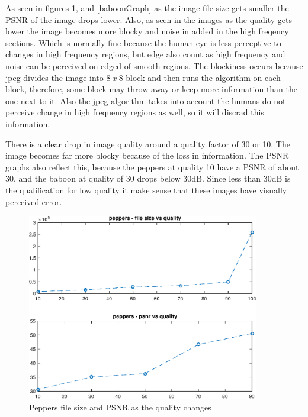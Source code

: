 \documentclass{article}
\begin{document}
\hfill \break 

As seen in figures \ref{pepperGraph}, and \ref{baboonGraph} as the image
file size gets smaller the PSNR of the image drops lower. Also, as seen in
the images as the quality gets lower the image becomes more blocky and noise
in added in the high freqency sections. Which is normally fine because the
human eye is less perceptive to changes in high frequency regions, but edge
also count as high frequency and noise can be perceived on edged of smooth
regions. 
The blockiness occurs because jpeg divides the image into $8 \ x \ 8$ block
and then runs the algorithm on each block, therefore, some block may throw away or
keep more information than the one next to it. Also the jpeg algorithm takes
into account the humans do not perceive change in high frequency regions as
well, so it will discrad this information. 

There is a clear drop in image quality around a quality factor of 30 or 10.
The image becomes far more blocky because of the loss in information. The
PSNR graphs also reflect this, because the peppers at quality 10 have a PSNR
of about 30, and the baboon at quality of 30 drops below 30dB. Since less
than 30dB is the qualification for low quality it make sense that these
images have visually perceived error.

\begin{figure}[H]
\centering
\includegraphics [width=4in]{lab2_01.eps}
\caption{Peppers file size and PSNR as the quality changes}
\label{pepperGraph}
\end{figure}
\end{document}
